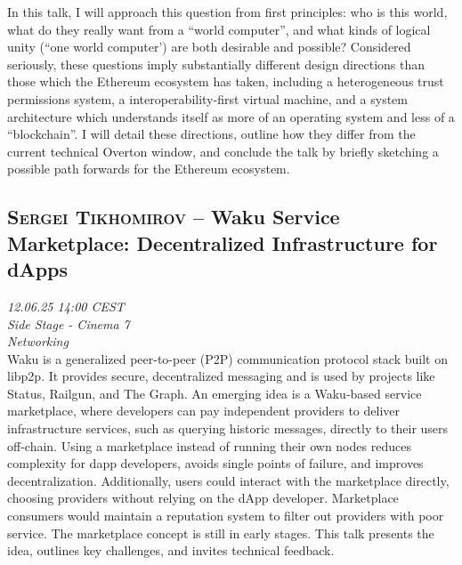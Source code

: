 In this talk, I will approach this question from first principles: who is this world, what do they really want from a ``world computer'', and what kinds of logical unity (``one world computer') are both desirable and possible? Considered seriously, these questions imply substantially different design directions than those which the Ethereum ecosystem has taken, including a heterogeneous trust permissions system, a interoperability-first virtual machine, and a system architecture which understands itself as more of an operating system and less of a ``blockchain''. I will detail these directions, outline how they differ from the current technical Overton window, and conclude the talk by briefly sketching a possible path forwards for the Ethereum ecosystem.

\clearpage
\subsection {\textsc{Sergei Tikhomirov}  -- Waku Service Marketplace: Decentralized Infrastructure for dApps} \noindent \textit {12.06.25 14:00 CEST\\ Side Stage - Cinema 7\\ Networking}\\[1em] Waku is a generalized peer-to-peer (P2P) communication protocol stack built on libp2p. It provides secure, decentralized messaging and is used by projects like Status, Railgun, and The Graph. An emerging idea is a Waku-based service marketplace, where developers can pay independent providers to deliver infrastructure services, such as querying historic messages, directly to their users off-chain. Using a marketplace instead of running their own nodes reduces complexity for dapp developers, avoids single points of failure, and improves decentralization. Additionally, users could interact with the marketplace directly, choosing providers without relying on the dApp developer. Marketplace consumers would maintain a reputation system to filter out providers with poor service. The marketplace concept is still in early stages. This talk presents the idea, outlines key challenges, and invites technical feedback.

\clearpage
